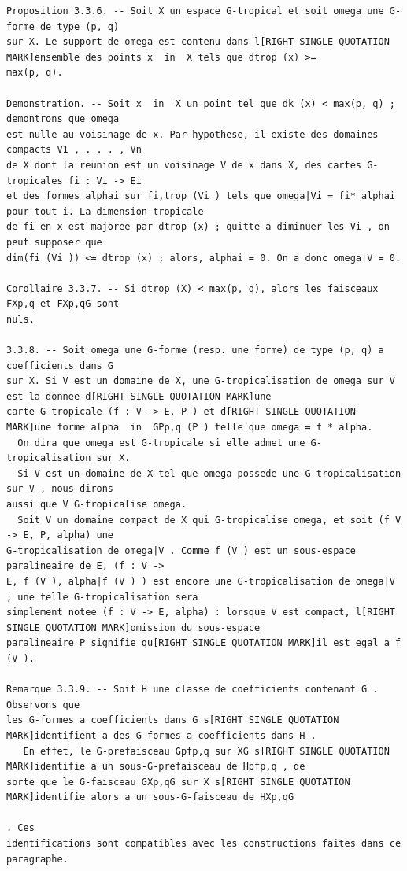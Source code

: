\documentclass[
  11pt,
]{article}
\begin{document}
\begin{lstlisting}
Proposition 3.3.6. -- Soit X un espace G-tropical et soit omega une G-forme de type (p, q)
sur X. Le support de omega est contenu dans l[RIGHT SINGLE QUOTATION MARK]ensemble des points x  in  X tels que dtrop (x) >=
max(p, q).

Demonstration. -- Soit x  in  X un point tel que dk (x) < max(p, q) ; demontrons que omega
est nulle au voisinage de x. Par hypothese, il existe des domaines compacts V1 , . . . , Vn
de X dont la reunion est un voisinage V de x dans X, des cartes G-tropicales fi : Vi -> Ei
et des formes alphai sur fi,trop (Vi ) tels que omega|Vi = fi* alphai pour tout i. La dimension tropicale
de fi en x est majoree par dtrop (x) ; quitte a diminuer les Vi , on peut supposer que
dim(fi (Vi )) <= dtrop (x) ; alors, alphai = 0. On a donc omega|V = 0.

Corollaire 3.3.7. -- Si dtrop (X) < max(p, q), alors les faisceaux FXp,q et FXp,qG sont
nuls.

3.3.8. -- Soit omega une G-forme (resp. une forme) de type (p, q) a coefficients dans G
sur X. Si V est un domaine de X, une G-tropicalisation de omega sur V est la donnee d[RIGHT SINGLE QUOTATION MARK]une
carte G-tropicale (f : V -> E, P ) et d[RIGHT SINGLE QUOTATION MARK]une forme alpha  in  GPp,q (P ) telle que omega = f * alpha.
  On dira que omega est G-tropicale si elle admet une G-tropicalisation sur X.
  Si V est un domaine de X tel que omega possede une G-tropicalisation sur V , nous dirons
aussi que V G-tropicalise omega.
  Soit V un domaine compact de X qui G-tropicalise omega, et soit (f V -> E, P, alpha) une
G-tropicalisation de omega|V . Comme f (V ) est un sous-espace paralineaire de E, (f : V ->
E, f (V ), alpha|f (V ) ) est encore une G-tropicalisation de omega|V ; une telle G-tropicalisation sera
simplement notee (f : V -> E, alpha) : lorsque V est compact, l[RIGHT SINGLE QUOTATION MARK]omission du sous-espace
paralineaire P signifie qu[RIGHT SINGLE QUOTATION MARK]il est egal a f (V ).

Remarque 3.3.9. -- Soit H une classe de coefficients contenant G . Observons que
les G-formes a coefficients dans G s[RIGHT SINGLE QUOTATION MARK]identifient a des G-formes a coefficients dans H .
   En effet, le G-prefaisceau Gpfp,q sur XG s[RIGHT SINGLE QUOTATION MARK]identifie a un sous-G-prefaisceau de Hpfp,q , de
sorte que le G-faisceau GXp,qG sur X s[RIGHT SINGLE QUOTATION MARK]identifie alors a un sous-G-faisceau de HXp,qG
                                                                                       . Ces
identifications sont compatibles avec les constructions faites dans ce paragraphe.


\end{lstlisting}
\end{document}
